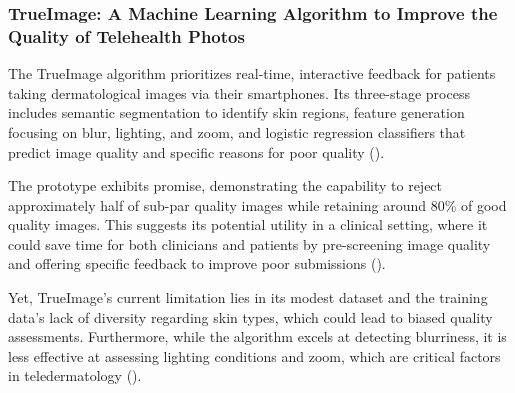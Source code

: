 \subsubsection{TrueImage: A Machine Learning Algorithm to Improve the Quality of Telehealth Photos}
\label{subsub:TrueImage}
The TrueImage algorithm prioritizes real-time, interactive feedback for patients taking dermatological images via their smartphones. Its three-stage process includes semantic segmentation to identify skin regions, feature generation focusing on blur, lighting, and zoom, and logistic regression classifiers that predict image quality and specific reasons for poor quality (\cite{TrueImage}). \par
\vspace{\baselineskip}
\noindent
The prototype exhibits promise, demonstrating the capability to reject approximately half of sub-par quality images while retaining around 80\% of good quality images. This suggests its potential utility in a clinical setting, where it could save time for both clinicians and patients by pre-screening image quality and offering specific feedback to improve poor submissions (\cite{TrueImage}).
\par
\vspace{\baselineskip}
\noindent
Yet, TrueImage’s current limitation lies in its modest dataset and the training data's lack of diversity regarding skin types, which could lead to biased quality assessments. Furthermore, while the algorithm excels at detecting blurriness, it is less effective at assessing lighting conditions and zoom, which are critical factors in teledermatology (\cite{TrueImage}).\par

